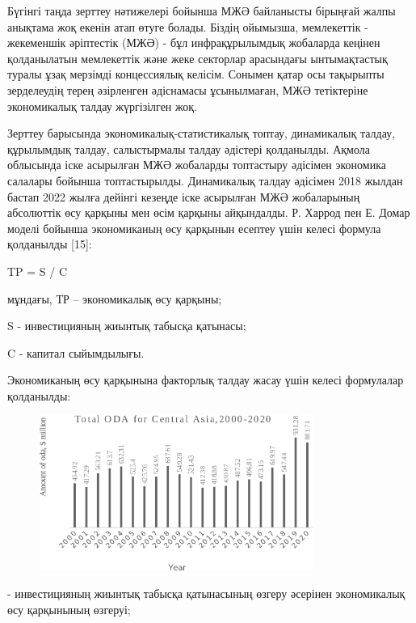 Бүгінгі таңда зерттеу нәтижелері бойынша МЖӘ байланысты бірыңғай жалпы
анықтама жоқ екенін атап өтуге болады. Біздің ойымызша, мемлекеттік -
жекеменшік әріптестік (МЖӘ) - бұл инфрақұрылымдық жобаларда кеңінен
қолданылатын мемлекеттік және жеке секторлар арасындағы ынтымақтастық
туралы ұзақ мерзімді концессиялық келісім. Сонымен қатар осы тақырыпты
зерделеудің терең әзірленген әдіснамасы ұсынылмаған, МЖӘ тетіктеріне
экономикалық талдау жүргізілген жоқ.

Зерттеу барысында экономикалық-статистикалық топтау, динамикалық талдау,
құрылымдық талдау, салыстырмалы талдау әдістері қолданылды. Ақмола
облысында іске асырылған МЖӘ жобаларды топтастыру әдісімен экономика
салалары бойынша топтастырылды. Динамикалық талдау әдісімен 2018 жылдан
бастап 2022 жылға дейінгі кезеңде іске асырылған МЖӘ жобаларының
абсолюттік өсу қарқыны мен өсім қарқыны айқындалды. Р. Харрод пен Е.
Домар моделі бойынша экономиканың өсу қарқынын есептеу үшін келесі
формула қолданылды {[}15{]}:

TP = S / C

мұндағы, ТР -- экономикалық өсу қарқыны;

S - инвестицияның жиынтық табысқа қатынасы;

C - капитал сыйымдылығы.

Экономиканың өсу қарқынына факторлық талдау жасау үшін келесі формулалар
қолданылды:

\begin{figure}[H]
	\centering
	\includegraphics[width=0.8\textwidth]{assets/341}
	\caption*{}
\end{figure}- инвестицияның жиынтық табысқа
қатынасының өзгеру әсерінен экономикалық өсу қарқынының өзгеруі;

